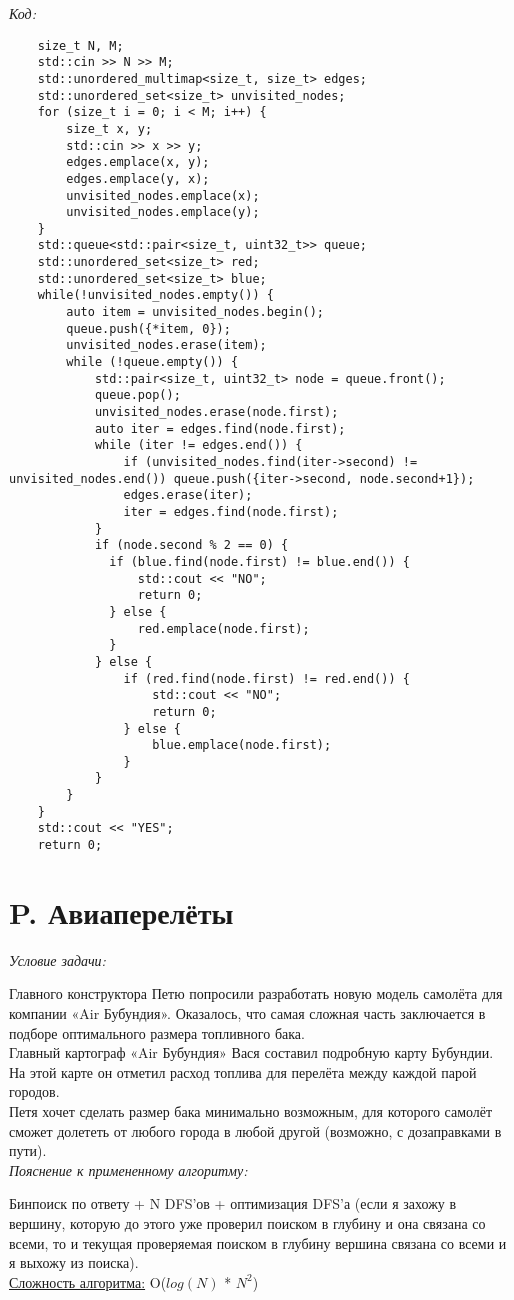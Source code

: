 \textit{Код:}
\tiny
\begin{center}
    \begin{verbatim}
    size_t N, M;
    std::cin >> N >> M;
    std::unordered_multimap<size_t, size_t> edges;
    std::unordered_set<size_t> unvisited_nodes;
    for (size_t i = 0; i < M; i++) {
        size_t x, y;
        std::cin >> x >> y;
        edges.emplace(x, y);
        edges.emplace(y, x);
        unvisited_nodes.emplace(x);
        unvisited_nodes.emplace(y);
    }
    std::queue<std::pair<size_t, uint32_t>> queue;
    std::unordered_set<size_t> red;
    std::unordered_set<size_t> blue;
    while(!unvisited_nodes.empty()) {
        auto item = unvisited_nodes.begin();
        queue.push({*item, 0});
        unvisited_nodes.erase(item);
        while (!queue.empty()) {
            std::pair<size_t, uint32_t> node = queue.front();
            queue.pop();
            unvisited_nodes.erase(node.first);
            auto iter = edges.find(node.first);
            while (iter != edges.end()) {
                if (unvisited_nodes.find(iter->second) != unvisited_nodes.end()) queue.push({iter->second, node.second+1});
                edges.erase(iter);
                iter = edges.find(node.first);
            }
            if (node.second % 2 == 0) {
              if (blue.find(node.first) != blue.end()) {
                  std::cout << "NO";
                  return 0;
              } else {
                  red.emplace(node.first);
              }
            } else {
                if (red.find(node.first) != red.end()) {
                    std::cout << "NO";
                    return 0;
                } else {
                    blue.emplace(node.first);
                }
            }
        }
    }
    std::cout << "YES";
    return 0;
    \end{verbatim}
\end{center}
\normalsize
\newpage


\section{P. Авиаперелёты}
\textit{Условие задачи:} \par
Главного конструктора Петю попросили разработать новую модель самолёта для компании «Air Бубундия». Оказалось, что самая сложная часть заключается в
подборе оптимального размера топливного бака.\\
Главный картограф «Air Бубундия» Вася составил подробную карту Бубундии. На этой карте он отметил расход топлива для перелёта между каждой парой городов.\\
Петя хочет сделать размер бака минимально возможным, для которого самолёт сможет долететь от любого города в любой другой (возможно, с дозаправками в пути).\\
\textit{Пояснение к примененному алгоритму:} \par
Бинпоиск по ответу + N DFS'ов + оптимизация DFS'а (если я захожу в вершину, которую до этого уже проверил поиском в глубину и она связана со всеми, то и
текущая проверяемая поиском в глубину вершина связана со всеми и я выхожу из поиска).\\
\underline{Сложность алгоритма:} O($log(N)$ * $N^2$)\\

